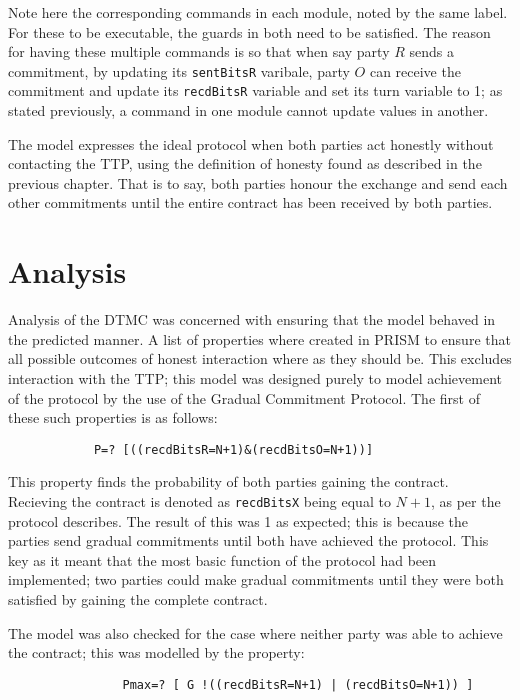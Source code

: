 \documentclass{l4proj}
\begin{document}
Note here the corresponding commands in each module, noted by the same label. For these to be executable, the guards in both need to be satisfied. The reason for having these multiple commands is so that when say party $R$ sends a commitment, by updating its {\tt sentBitsR} varibale, party $O$ can receive the commitment and update its {\tt recdBitsR} variable and set its turn variable to 1; as stated previously, a command in one module cannot update values in another.

The model expresses the ideal protocol when both parties act honestly without contacting the TTP, using the definition of honesty found as described in the previous chapter. That is to say, both parties honour the exchange and send each other commitments until the entire contract has been received by both parties. 


\section{Analysis}

Analysis of the DTMC was concerned with ensuring that the model behaved in the predicted manner. A list of properties where created in PRISM to ensure that all possible outcomes of honest interaction where as they should be. This excludes interaction with the TTP; this model was designed purely to model achievement of the protocol by the use of the Gradual Commitment Protocol. The first of these such properties is as follows:

\begin{lstlisting}
            P=? [((recdBitsR=N+1)&(recdBitsO=N+1))]
\end{lstlisting}

This property finds the probability of both parties gaining the contract. Recieving the contract is denoted as {\tt recdBitsX} being equal to $N+1$, as per the protocol describes. The result of this was 1 as expected; this is because the parties send gradual commitments until both have achieved the protocol. This key as it meant that the most basic function of the protocol had been implemented; two parties could make gradual commitments until they were both satisfied by gaining the complete contract.

The model was also checked for the case where neither party was able to achieve the contract; this was modelled by the property:

\begin{lstlisting}
                Pmax=? [ G !((recdBitsR=N+1) | (recdBitsO=N+1)) ]
\end{lstlisting}
\end{document}
